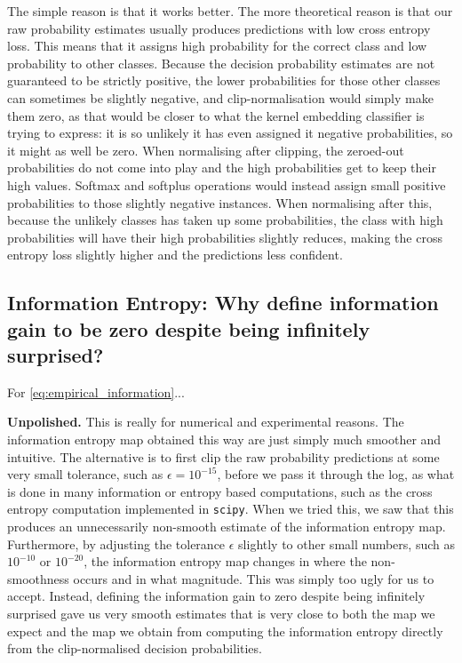\documentclass{article}
\newcommand{\note}[1]{{\color{orange} #1}}
\begin{document}
		The simple reason is that it works better. The more theoretical reason is that our raw probability estimates usually produces predictions with low cross entropy loss. This means that it assigns high probability for the correct class and low probability to other classes. Because the decision probability estimates are not guaranteed to be strictly positive, the lower probabilities for those other classes can sometimes be slightly negative, and clip-normalisation would simply make them zero, as that would be closer to what the kernel embedding classifier is trying to express: it is so unlikely it has even assigned it negative probabilities, so it might as well be zero. When normalising after clipping, the zeroed-out probabilities do not come into play and the high probabilities get to keep their high values. Softmax and softplus operations would instead assign small positive probabilities to those slightly negative instances. When normalising after this, because the unlikely classes has taken up some probabilities, the class with high probabilities will have their high probabilities slightly reduces, making the cross entropy loss slightly higher and the predictions less confident.
		
	\subsection{Information Entropy: Why define information gain to be zero despite being infinitely surprised?}
	
		For \eqref{eq:empirical_information}...
		
		\note{\textbf{Unpolished.}} This is really for numerical and experimental reasons. The information entropy map obtained this way are just simply much smoother and intuitive. The alternative is to first clip the raw probability predictions at some very small tolerance, such as $\epsilon = 10^{-15}$, before we pass it through the log, as what is done in many information or entropy based computations, such as the cross entropy computation implemented in \texttt{scipy}. When we tried this, we saw that this produces an unnecessarily non-smooth estimate of the information entropy map. Furthermore, by adjusting the tolerance $\epsilon$ slightly to other small numbers, such as $10^{-10}$ or $10^{-20}$, the information entropy map changes in where the non-smoothness occurs and in what magnitude. This was simply too ugly for us to accept. Instead, defining the information gain to zero despite being infinitely surprised gave us very smooth estimates that is very close to both the map we expect and the map we obtain from computing the information entropy directly from the clip-normalised decision probabilities.
		
\end{document}
